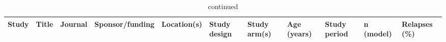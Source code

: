 \begin{ThreePartTable}
\begin{longtable}[c]{L{1.5cm} L{3.5cm} L{1.3cm} L{2.5cm} L{2.5cm} L{2.5cm} L{3cm} L{1.5cm} L{1cm} L{1cm} L{1.3cm}}
    \caption[]{continued}                                                                                                                                                                                                                                                                                                                                                                                                                                                                                                                                                                                                                                                                                                                                                                                                                                                                                                                                                                                                                                                                                                                                                                                                                                                                                                                                                                                         \\
    \toprule
    Study                                  & Title                                                                                                                                                                                                                       & Journal                  & Sponsor/funding                                                                      & Location(s)                                       & Study design                                                                       & Study arm(s)                                                                                                                                                                                                          & Age (years) & Study period & n (model)    & Relapses (\%)                                                                                                                                                                                                                                                                                                                                                                                                                                                                                                                                                                                  \\ \midrule
    \endhead


\end{longtable}
\end{ThreePartTable}
